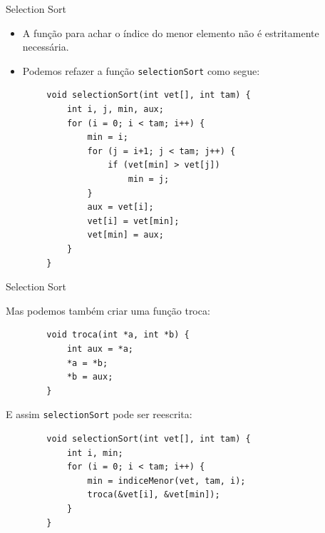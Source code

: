 \documentclass[handout]{beamer}
\newcommand{\cod}[1]{\texttt{#1}}
\begin{document}
\begin{frame}[fragile]{Selection Sort}

    \begin{itemize}
        \item A função para achar o índice do menor elemento não é estritamente necessária.
        \item Podemos refazer a função \cod{selectionSort} como segue:
    \end{itemize}
    \vspace{-1.5em}
    \begin{verbatim}
        void selectionSort(int vet[], int tam) {
            int i, j, min, aux;
            for (i = 0; i < tam; i++) {
                min = i;
                for (j = i+1; j < tam; j++) {
                    if (vet[min] > vet[j])
                        min = j;
                } 
                aux = vet[i];
                vet[i] = vet[min];
                vet[min] = aux;
            }
        }
    \end{verbatim}

\end{frame}

\begin{frame}[fragile]{Selection Sort}
    
    Mas podemos também criar uma função troca:
    \vspace{-1em}
    \begin{verbatim}
        void troca(int *a, int *b) {
            int aux = *a;
            *a = *b;
            *b = aux;
        }
    \end{verbatim}
    \pause

    E assim \cod{selectionSort} pode ser reescrita:
    \vspace{-1em}
    \begin{verbatim}
        void selectionSort(int vet[], int tam) {
            int i, min;
            for (i = 0; i < tam; i++) {
                min = indiceMenor(vet, tam, i);
                troca(&vet[i], &vet[min]);
            }
        }
    \end{verbatim}

\end{frame}

\end{document}
